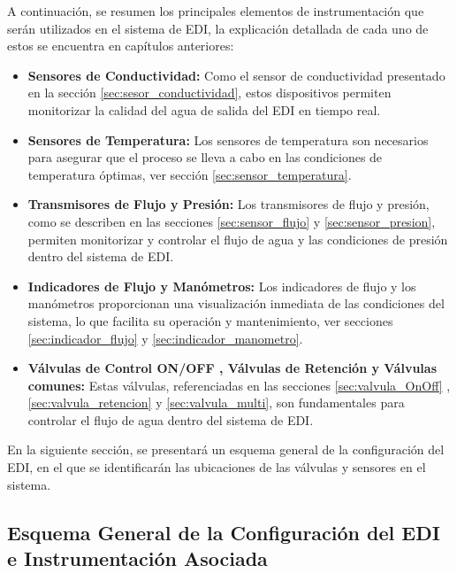 A continuación, se resumen los principales elementos de instrumentación que serán utilizados en el sistema de EDI, la explicación detallada de cada uno de estos se encuentra en capítulos anteriores:
\begin{itemize}
    \item \textbf{Sensores de Conductividad:} Como el sensor de conductividad presentado en la sección \ref{sec:sesor_conductividad}, estos dispositivos permiten monitorizar la calidad del agua de salida del EDI en tiempo real.

    \item \textbf{Sensores de Temperatura:} Los sensores de temperatura son necesarios para asegurar que el proceso se lleva a cabo en las condiciones de temperatura óptimas, ver sección \ref{sec:sensor_temperatura}.

    \item \textbf{Transmisores de Flujo y Presión:} Los transmisores de flujo y presión, como se describen en las secciones \ref{sec:sensor_flujo} y \ref{sec:sensor_presion}, permiten monitorizar y controlar el flujo de agua y las condiciones de presión dentro del sistema de EDI.

    \item \textbf{Indicadores de Flujo y Manómetros:} Los indicadores de flujo y los manómetros proporcionan una visualización inmediata de las condiciones del sistema, lo que facilita su operación y mantenimiento, ver secciones \ref{sec:indicador_flujo} y \ref{sec:indicador_manometro}.

    \item \textbf{Válvulas de Control ON/OFF , Válvulas de Retención y Válvulas comunes:} Estas válvulas, referenciadas en las secciones \ref{sec:valvula_OnOff} , \ref{sec:valvula_retencion} y \ref{sec:valvula_multi}, son fundamentales para controlar el flujo de agua dentro del sistema de EDI.
\end{itemize}

En la siguiente sección, se presentará un esquema general de la configuración del EDI, en el que se identificarán las ubicaciones de las válvulas y sensores en el sistema.



\subsection{Esquema General de la Configuración del EDI e Instrumentación Asociada}